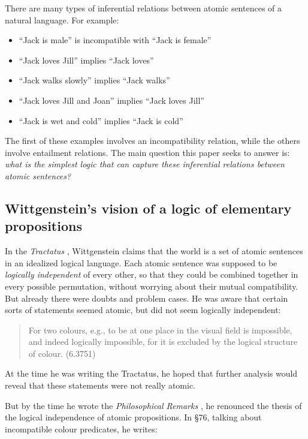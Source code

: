 There are many types of inferential relations between atomic
sentences of a natural language.  For example:

\begin{itemize}

\item ``Jack is male'' is incompatible with ``Jack is female''
\item ``Jack loves Jill'' implies ``Jack loves''
\item ``Jack walks slowly'' implies ``Jack walks''
\item ``Jack loves Jill and Joan'' implies ``Jack loves Jill''
\item ``Jack is wet and cold'' implies ``Jack is cold''

\end{itemize}

\NI The first of these examples involves an incompatibility
relation, while the others involve
entailment relations.  The main question this paper seeks to answer is:
\emph{what is the simplest logic that can capture these inferential
  relations between atomic sentences?}

\subsection{Wittgenstein's vision of a logic of elementary propositions}

\NI In the \emph{Tractatus} \cite{wittgenstein-tractatus}, Wittgenstein
claims that the world is a set of atomic sentences in an idealized
logical language.  Each atomic sentence was supposed to be
\emph{logically independent} of every other, so that they could be
combined together in every possible permutation, without worrying
about their mutual compatibility.
But already there were doubts and problem cases.  He was aware that
certain sorts of statements seemed atomic, but did not seem logically
independent:

\begin{quote}
  For two colours, e.g., to be at one place in the visual field is
  impossible, and indeed logically impossible, for it is excluded by
  the logical structure of colour. (6.3751)
\end{quote}

\NI At the time he was writing the Tractatus, he hoped that further
analysis would reveal that these statements were not really atomic.

But by the time he wrote the \emph{Philosophical Remarks} \cite{wittgenstein-remarks}, he
renounced the thesis of the logical independence of atomic
propositions.  In \S 76, talking about incompatible colour predicates,
he writes:

